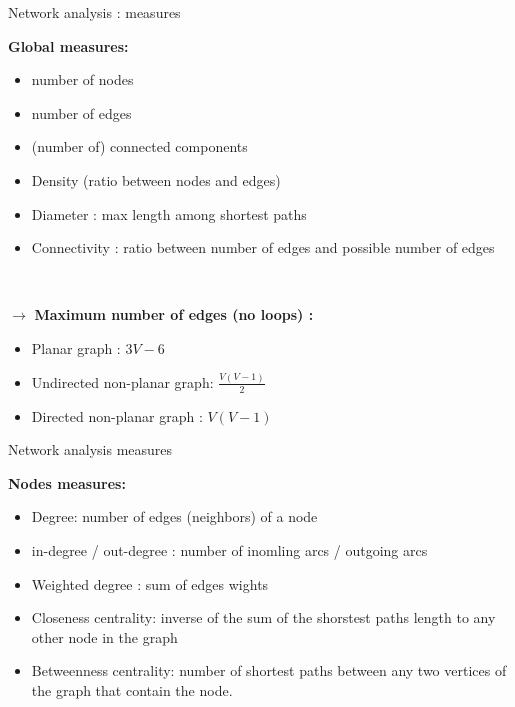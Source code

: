 \begin{frame}{Network analysis : measures}

\textbf{Global measures:}

\begin{itemize}
\item number of nodes
\item number of edges
\item (number of) connected components
\item Density (ratio between nodes and edges)
\item Diameter : max length among shortest paths 
\item Connectivity : ratio between number of edges and possible number of edges
\end{itemize}

~

$\rightarrow$ \textbf{Maximum number of edges (no loops) :}

\begin{itemize}
\item Planar graph : $3V - 6$
\item Undirected non-planar graph: $\frac{V(V-1)}{2}$ 
\item  Directed non-planar graph : $V(V-1)$
\end{itemize}

\end{frame}

\begin{frame}{Network analysis measures}

\textbf{Nodes measures:}

\begin{itemize}
\item Degree: number of edges (neighbors) of a node 
\item in-degree / out-degree : number of inomling arcs / outgoing arcs
\item Weighted degree : sum of edges wights
\item Closeness centrality:  inverse of the sum of the shorstest paths length to any other node in the graph
\item Betweenness centrality: number of shortest paths between any two vertices of the graph that contain the node.
\end{itemize}

\end{frame}


